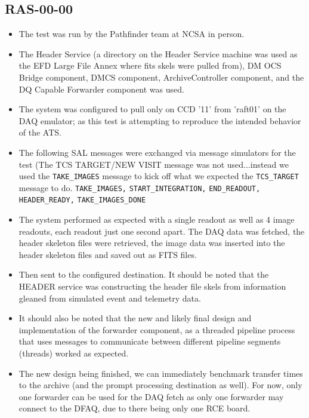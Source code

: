 \documentclass[DM,lsstdraft,STR,toc]{lsstdoc}
\begin{document}
\subsection{RAS-00-00}
\label{sect:detail-RAS-00-00}
\begin{itemize}

  \item{

The test was run by the Pathfinder team at NCSA in person.
}

  \item{
The Header Service (a directory on the Header Service machine was used as the EFD Large File Annex where fits skels were pulled from), DM OCS Bridge component, DMCS component, ArchiveController component, and the DQ Capable Forwarder component was used.
}
 \item{
The system was configured to pull only on CCD '11' from 'raft01' on the DAQ emulator; as this test is attempting to reproduce the intended behavior of the ATS.
}
 \item{
The following SAL messages were exchanged via message simulators for the test (The TCS TARGET/NEW VISIT message was not used...instead we used the \texttt{TAKE{\_}IMAGES} message to kick off what we expected the \texttt{TCS{\_}TARGET} message to do.
\texttt{TAKE{\_}IMAGES,}
\texttt{START{\_}INTEGRATION,}
\texttt{END{\_}READOUT,}
\texttt{HEADER{\_}READY,}
\texttt{TAKE{\_}IMAGES{\_}DONE}
}
 \item{
The system performed as expected with a single readout as well as 4 image readouts, each readout just one second apart.
The DAQ data was fetched, the header skeleton files were retrieved, the image data was inserted into the header skeleton files and saved out as FITS files.
}
 \item{
Then sent to the configured destination.
It should be noted that the HEADER service was constructing the header file skels from information gleaned from simulated event and telemetry data.
}
 \item{
It should also be noted that the new and likely final design and implementation of the forwarder component, as a threaded pipeline process that uses messages to communicate between different pipeline segments (threads) worked as expected.
}
 \item{
The new design being finished, we can immediately benchmark transfer times to the archive (and the prompt processing destination as well). For now, only one forwarder can be used for the DAQ fetch as only one forwarder may connect to the DFAQ, due to there being only one RCE board.
}
\end{itemize}
\end{document}
